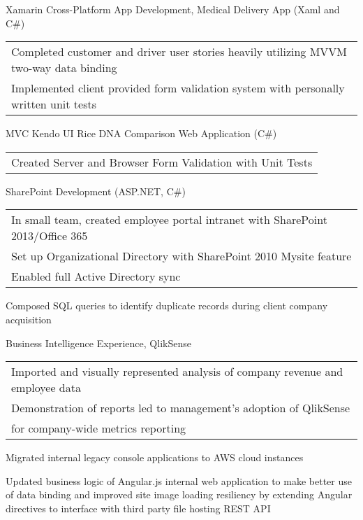 \documentclass[letterpaper]{deedy-resume} %
\begin{document}
\begin{minipage}[t]{0.73\textwidth}
\begin{tightitemize}
\item Xamarin Cross-Platform App Development, Medical Delivery App (Xaml and C\#)
\begin{tabular}{l} 
Completed customer and driver user stories heavily utilizing MVVM two-way data binding \\
Implemented client provided form validation system with personally written unit tests \\
\end{tabular}
\item MVC Kendo UI Rice DNA Comparison Web Application (C\#)
\begin{tabular}{l}
Created Server and Browser Form Validation with Unit Tests\\
\end{tabular}
\item SharePoint Development (ASP.NET, C\#)
\begin{tabular}{l}
In small team, created employee portal intranet with SharePoint 2013/Office 365 \\ 
Set up Organizational Directory with SharePoint 2010 Mysite feature \\ Enabled full Active Directory sync \\
\end{tabular}
\item Composed SQL queries to identify duplicate records during client company acquisition\\
\item Business Intelligence Experience, QlikSense
\begin{tabular}{l}
Imported and visually represented analysis of company revenue and employee data  \\ 
Demonstration of reports led to management's adoption of QlikSense \\ for company-wide metrics reporting \\
\end{tabular}
\item Migrated internal legacy console applications to AWS cloud instances 
\item Updated business logic of Angular.js internal web application to make better use of data binding and improved site image loading resiliency by extending Angular directives to interface with third party file hosting REST API  \\
\end{tightitemize}
\sectionspace %


\end{minipage}
\end{document}
